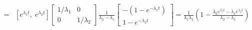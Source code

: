\begin{itemize}
\begin{eqnarray}
  \nonumber\\
  &=&\left[e^{\lambda_1t},\;e^{\lambda_2t}\right]
    \left[\begin{array}{cc}1/\lambda_1&0\\0&1/\lambda_2\end{array}\right]
    \frac{1}{\lambda_2-\lambda_1}
  \left[\begin{array}{c}-(1-e^{-\lambda_1t})\\1-e^{-\lambda_2t}\end{array}\right]    
  =\frac{1}{\lambda_1\lambda_2}
  \left(1-\frac{\lambda_2e^{\lambda_1t}-\lambda_1e^{\lambda_2t}}{\lambda_2-\lambda_1}\right)
  \nonumber
  \end{eqnarray}
\end{itemize}




